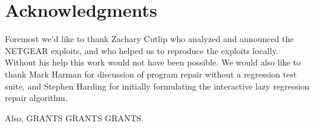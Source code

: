 \documentclass{sigcomm-alternate}
\begin{document}
\section{Acknowledgments}
\label{sec-7}
Foremost we'd like to thank Zachary Cutlip who analyzed and announced
the NETGEAR exploits, and who helped us to reproduce the exploits
locally.  Without his help this work would not have been possible.  We
would also like to thank Mark Harman for discussion of program repair
without a regression test suite, and Stephen Harding for initially
formulating the interactive lazy regression repair algorithm.

Also, GRANTS GRANTS GRANTS.



\end{document}
